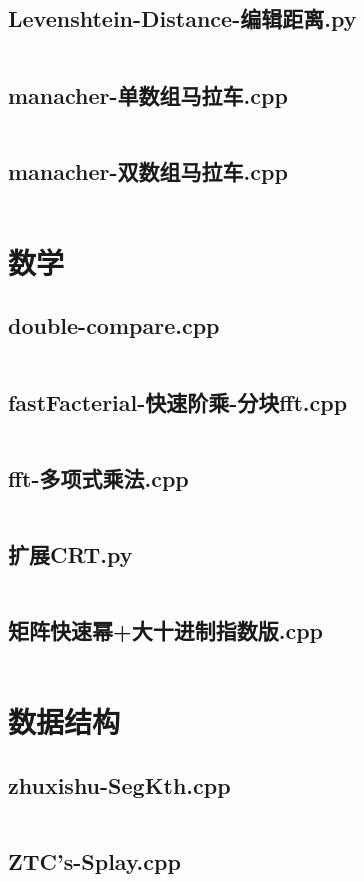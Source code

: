 \documentclass[a4paper,landscape,twocolumn]{article} %
\begin{document}
\subsection{Levenshtein-Distance-编辑距离.py}
\inputminted{python}{./codes/019}
\subsection{manacher-单数组马拉车.cpp}
\inputminted{c++}{./codes/020}
\subsection{manacher-双数组马拉车.cpp}
\inputminted{c++}{./codes/021}
\section{数学}
\subsection{double-compare.cpp}
\inputminted{c++}{./codes/022}
\subsection{fastFacterial-快速阶乘-分块fft.cpp}
\inputminted{c++}{./codes/023}
\subsection{fft-多项式乘法.cpp}
\inputminted{c++}{./codes/024}
\subsection{扩展CRT.py}
\inputminted{python}{./codes/025}
\subsection{矩阵快速幂+大十进制指数版.cpp}
\inputminted{c++}{./codes/026}
\section{数据结构}
\subsection{zhuxishu-SegKth.cpp}
\inputminted{c++}{./codes/027}
\subsection{ZTC's-Splay.cpp}
\inputminted{c++}{./codes/028}
\end{document}
